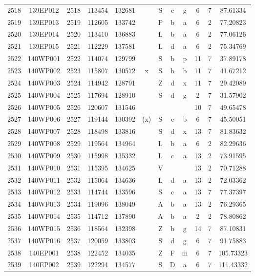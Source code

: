 \begin{tabular}{|*{12}{c|}}
2518 & 139EP012 & 2518 & 113454 & 132681 &  & S & c & g & 6 & 7 & 87.61334 \\ 
2519 & 139EP013 & 2519 & 112605 & 133742 &  & P & b & a & 6 & 2 & 77.20823 \\ 
2520 & 139EP014 & 2520 & 113410 & 136883 &  & L & b & a & 6 & 2 & 77.06126 \\ 
2521 & 139EP015 & 2521 & 112229 & 137581 &  & L & d & a & 6 & 2 & 75.34769 \\ 
2522 & 140WP001 & 2522 & 114074 & 129799 &  & S & b & p & 11 & 7 & 37.89178 \\ 
2523 & 140WP002 & 2523 & 115807 & 130572 & x & S & b & b & 11 & 7 & 41.67212 \\ 
2524 & 140WP003 & 2524 & 114942 & 128791 &  & Z & d & x & 11 & 7 & 29.42089 \\ 
2525 & 140WP004 & 2525 & 117694 & 128910 &  & S & d & g & 2 & 7 & 31.57902 \\ 
2526 & 140WP005 & 2526 & 120607 & 131546 &  &  &  &  & 10 & 7 & 49.65478 \\ 
2527 & 140WP006 & 2527 & 119144 & 130392 & (x) & S & c & b & 6 & 7 & 45.50051 \\ 
2528 & 140WP007 & 2528 & 118498 & 133816 &  & S & d & x & 13 & 7 & 81.83632 \\ 
2529 & 140WP008 & 2529 & 119564 & 134964 &  & L & b & a & 6 & 2 & 82.29636 \\ 
2530 & 140WP009 & 2530 & 115998 & 135332 &  & L & c & a & 13 & 2 & 73.91595 \\ 
2531 & 140WP010 & 2531 & 115395 & 134625 &  & V &  &  & 13 & 2 & 70.71288 \\ 
2532 & 140WP011 & 2532 & 115064 & 134636 &  & L & d & a & 13 & 2 & 72.03362 \\ 
2533 & 140WP012 & 2533 & 114744 & 133596 &  & S & c & a & 13 & 7 & 77.37397 \\ 
2534 & 140WP013 & 2534 & 119096 & 138049 &  & A & b & a & 13 & 2 & 76.29365 \\ 
2535 & 140WP014 & 2535 & 114712 & 137890 &  & A & b & a & 2 & 2 & 78.80862 \\ 
2536 & 140WP015 & 2536 & 118564 & 132398 &  & Z & b & g & 14 & 7 & 87.10831 \\ 
2537 & 140WP016 & 2537 & 120059 & 133803 &  & S & d & g & 6 & 7 & 91.75883 \\ 
2538 & 140EP001 & 2538 & 122452 & 134035 &  & Z & F & m & 6 & 7 & 105.73323 \\ 
2539 & 140EP002 & 2539 & 122294 & 134577 &  & S & D & a & 6 & 7 & 111.43332 \\ 

\end{tabular}
